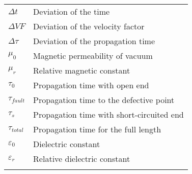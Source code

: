 \begin{longtable}[l]{@{}ll@{}}
    \( \Delta t \) & Deviation of the time\\
    \( \Delta VF \) & Deviation of the velocity factor\\
    \( \Delta \tau \) & Deviation of the propagation time\\
    \( \mu_0 \) & Magnetic permeability of vacuum\\
    \( \mu_r \) & Relative magnetic constant\\
    \( \tau_0 \) & Propagation time with open end\\
    \( \tau_{fault} \) & Propagation time to the defective point\\
    \( \tau_s \) & Propagation time with short-circuited end\\
    \( \tau_{total} \) & Propagation time for the full length\\
    \( \varepsilon_0 \) & Dielectric constant\\
    \( \varepsilon_r \) & Relative dielectric constant\\
    \label{tab:glossar}
\end{longtable}